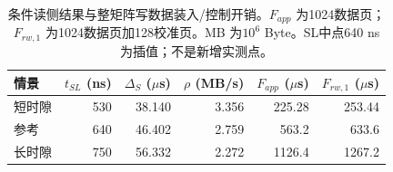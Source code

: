 \begin{table}[htbp]\centering\small
\begin{tabular}{@{}lrrrrr@{}}\toprule
情景 & $t_{SL}$ (ns) & $\Delta_S$ ($\mu$s) & $\rho$ (MB/s) & $F_{app}$ ($\mu$s) & $F_{rw,1}$ ($\mu$s)\\\midrule
短时隙 & 530 & 38.140 & 3.356 & 225.28 & 253.44\\
参考 & 640 & 46.402 & 2.759 & 563.2 & 633.6\\
长时隙 & 750 & 56.332 & 2.272 & 1126.4 & 1267.2\\
\bottomrule\end{tabular}
\caption{条件读侧结果与整矩阵写数据装入/控制开销。$F_{app}$ 为1024数据页；$F_{rw,1}$ 为1024数据页加128校准页。MB 为$10^6$ Byte。SL中点640 ns为插值；不是新增实测点。}
\label{tab:read}\end{table}
